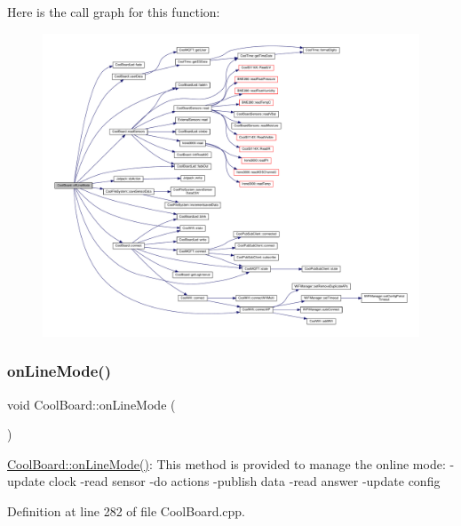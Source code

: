 Here is the call graph for this function\+:\nopagebreak
\begin{figure}[H]
\begin{center}
\leavevmode
\includegraphics[width=350pt]{d7/df9/class_cool_board_ae6b5e1274d760462290192acea4adca8_cgraph}
\end{center}
\end{figure}
\mbox{\label{class_cool_board_aa0bbc4bc605e35618d18e68795c61363}} 
\subsubsection{\texorpdfstring{on\+Line\+Mode()}{onLineMode()}}
{\footnotesize\ttfamily void Cool\+Board\+::on\+Line\+Mode (\begin{DoxyParamCaption}{ }\end{DoxyParamCaption})}

\hyperlink{class_cool_board_aa0bbc4bc605e35618d18e68795c61363}{Cool\+Board\+::on\+Line\+Mode()}\+: This method is provided to manage the online mode\+: -\/update clock -\/read sensor -\/do actions -\/publish data -\/read answer -\/update config 

Definition at line 282 of file Cool\+Board.\+cpp.


